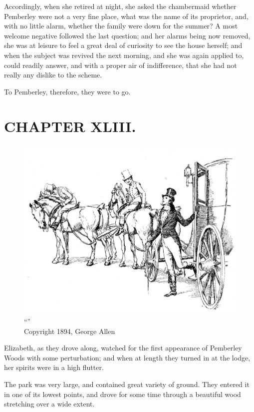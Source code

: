 Accordingly, when she retired at night, she asked the chambermaid whether Pemberley were not a very fine place, what was the name of its proprietor, and, with no little alarm, whether the family were down for the summer? A most welcome negative followed the last question; and her alarms being now removed, she was at leisure to feel a great deal of curiosity to see the house herself; and when the subject was revived the next morning, and she was again applied to, could readily answer, and with a proper air of indifference, that she had not really any dislike to the scheme.

To Pemberley, therefore, they were to go.



\chapter{CHAPTER XLIII.}

\begin{figure}[htbp]
    \centering
    \includegraphics[width=\textwidth]{illustrations/i_031.jpg}
    \caption{“”\\ Copyright 1894, George Allen}
    \label{fig:image}
\end{figure}


Elizabeth, as they drove along, watched for the first appearance of Pemberley Woods with some perturbation; and when at length they turned in at the lodge, her spirits were in a high flutter.

The park was very large, and contained great variety of ground. They entered it in one of its lowest points, and drove for some time through a beautiful wood stretching over a wide extent.

